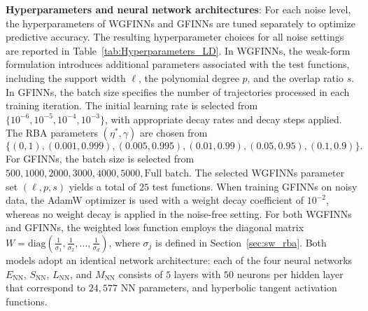 \documentclass[final]{siamltex}
\begin{document}
\begin{appendices}
{\bf Hyperparameters and neural network architectures}:
For each noise level, the hyperparameters of WGFINNs and GFINNs are tuned separately to optimize predictive accuracy.
The resulting hyperparameter choices for all noise settings are reported in Table~\ref{tab:Hyperparameters_LD}.
In WGFINNs, the weak-form formulation introduces additional parameters associated with the test functions, including the support width $\ell$, the polynomial degree $p$, and the overlap ratio $s$.
In GFINNs, the batch size specifies the number of trajectories processed in each training iteration.
The initial learning rate is selected from $\{10^{-6}, 10^{-5}, 10^{-4}, 10^{-3}\}$, with appropriate decay rates and decay steps applied.
The RBA parameters $(\eta^*, \gamma)$ are chosen from
\begin{equation*}
\{ (0 , 1), (0.001 , 0.999), (0.005 , 0.995), (0.01 , 0.99), (0.05 , 0.95), (0.1, 0.9)\}.
\end{equation*}
For GFINNs, the batch size is selected from
${500, 1000, 2000, 3000, 4000, 5000, \text{Full batch}}$.
The selected WGFINNs parameter set $(\ell, p, s)$ yields a total of $25$ test functions.
When training GFINNs on noisy data, the AdamW optimizer is used with a weight decay coefficient of $10^{-2}$, whereas no weight decay is applied in the noise-free setting.
For both WGFINNs and GFINNs, the weighted loss function employs the diagonal matrix
$W = \mathrm{diag}\left(\frac{1}{\sigma_1}, \frac{1}{\sigma_2}, \ldots, \frac{1}{\sigma_d}\right)$,
where $\sigma_j$ is defined in Section~\ref{sec:sw_rba}.
Both models adopt an identical network architecture: each of the four neural networks $E_{\mathrm{NN}}$, $S_{\mathrm{NN}}$, $L_{\mathrm{NN}}$, and $M_{\mathrm{NN}}$ consists of $5$ layers with $50$ neurons per hidden layer that correspond to \(24{,}577\) NN parameters, and hyperbolic tangent activation functions.



\end{appendices}
\end{document}
